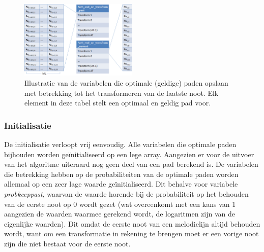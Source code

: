 \begin{figure}[!ht]
  \centering
  \includegraphics[width=0.5\textwidth]{4_Efficient_Toepassen_Transformatie/path_transform_algo_2}
  \caption{Illustratie van de variabelen die optimale (geldige) paden opslaan met betrekking tot het transformeren van de laatste noot. Elk element in deze tabel stelt een optimaal en geldig pad voor.}
  \label{figuur:path_transform_algo_2}
\end{figure}

\subsubsection{Initialisatie}
De initialisatie verloopt vrij eenvoudig. Alle variabelen die optimale paden bijhouden worden ge\"initialiseerd op een lege array. Aangezien er voor de uitvoer van het algoritme uiteraard nog geen deel van een pad berekend is. De variabelen die betrekking hebben op de probabiliteiten van de optimale paden worden allemaal op een zeer lage waarde ge\"initialiseerd. Dit behalve voor variabele \textit{prob\textunderscore keep\textunderscore past}, waarvan de waarde horende bij de probabiliteit op het behouden van de eerste noot op 0 wordt gezet (wat overeenkomt met een kans van 1 aangezien de waarden waarmee gerekend wordt, de logaritmen zijn van de eigenlijke waarden). Dit omdat de eerste noot van een melodielijn altijd behouden wordt, want om een transformatie in rekening te brengen moet er een vorige noot zijn die niet bestaat voor de eerste noot.

